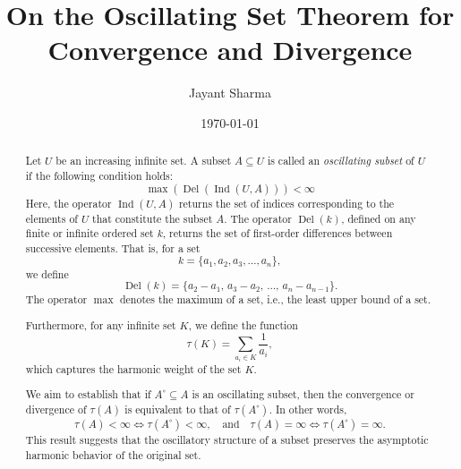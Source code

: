 \documentclass[9pt]{amsart}
\title{\textbf{On the Oscillating Set Theorem for Convergence and Divergence}}
\author{Jayant Sharma}
\date{\today}
\DeclareMathOperator{\del}{Del}
\DeclareMathOperator{\ind}{Ind}
\theoremstyle{plain}
\begin{document}
\maketitle

\begin{abstract}
Let $U$ be an increasing infinite set. A subset $A \subseteq U$ is called an \emph{oscillating subset} of $U$ if the following condition holds:
\[
\max \left( \del\left( \ind(U, A) \right) \right) < \infty
\]
Here, the operator $\ind(U, A)$ returns the set of indices corresponding to the elements of $U$ that constitute the subset $A$. The operator $\del(k)$, defined on any finite or infinite ordered set $k$, returns the set of first-order differences between successive elements. That is, for a set
\[
k = \{ a_1, a_2, a_3, \dots, a_n \},
\]
we define
\[
\del(k) = \{ a_2 - a_1,\, a_3 - a_2,\, \dots,\, a_n - a_{n-1} \}.
\]
The operator $\max$ denotes the maximum of a set, i.e., the least upper bound of a set.

Furthermore, for any infinite set $K$, we define the function
\[
\tau(K) = \sum_{a_i \in K} \frac{1}{a_i},
\]
which captures the harmonic weight of the set $K$.

We aim to establish that if $A^\circ \subseteq A$ is an oscillating subset, then the convergence or divergence of $\tau(A)$ is equivalent to that of $\tau(A^\circ)$. In other words,
\[
\tau(A) < \infty \iff \tau(A^\circ) < \infty, \quad \text{and} \quad \tau(A) = \infty \iff \tau(A^\circ) = \infty.
\]
This result suggests that the oscillatory structure of a subset preserves the asymptotic harmonic behavior of the original set.
\end{abstract}

\tableofcontents





\nocite{*}



\end{document}
